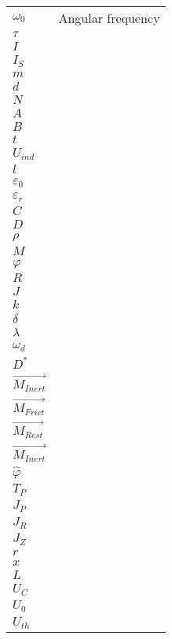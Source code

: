 %
\begin{longtable}[l]{@{}ll@{}}%
    \( \omega_0 \) & Angular frequency\\
    \(\tau\) & \\
    \( I \) & \\
    \( I_S \) & \\
    \( m \) & \\
    \( d \) & \\
    \( N \) & \\
    \( A \) & \\
    \( B \) & \\
    \( t \) & \\
    \( U_{ind} \) & \\
    \( l \) & \\
    \( \varepsilon_0 \) & \\
    \( \varepsilon_r \) & \\
    \( C \) & \\
    \( D \) & \\
    \( \rho \) & \\
    \( M \) & \\
    \( \varphi \) & \\
    \( R \) & \\
    \( J \) & \\
    \( k \) & \\
    \( \delta \) & \\
    \( \lambda \) & \\
    \( \omega_d \) & \\
    \( D^* \) & \\
    \( \vec{M_{Inert}} \) & \\
    \( \vec{M_{Frict}} \) & \\
    \( \vec{M_{Rest}} \) & \\
    \( \vec{M_{Inert}} \) & \\
    \( \hat{\varphi} \) & \\
    \( T_P \) & \\
    \( J_P \) & \\
    \( J_R \) & \\
    \( J_Z \) & \\
    \( r \) & \\
    \( x \) & \\
    \( L \) & \\
    \( U_C \) & \\
    \( U_0 \) & \\
    \( U_{th} \) & \\

\end{longtable}
